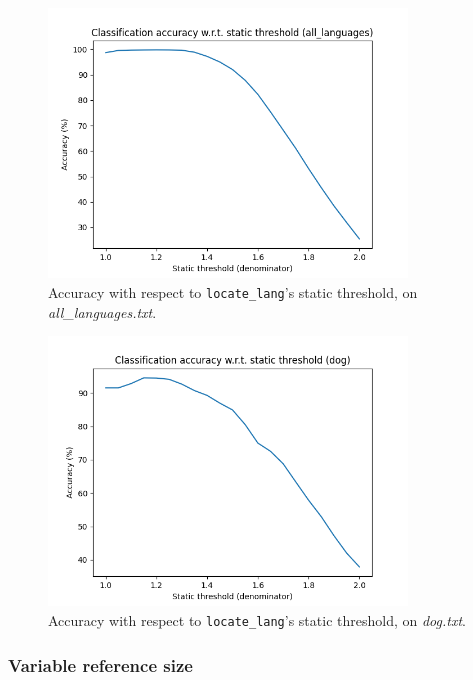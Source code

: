 \documentclass{article}
\begin{document}
\begin{figure}
    \centering
    \includegraphics[width=0.85\textwidth]{../results/all_languages/ll-s.png}
    \caption{Accuracy with respect to \texttt{locate\_lang}'s static threshold, on \textit{all\_languages.txt}.}
    \label{fig:ll_s_all_languages}
\end{figure}

\begin{figure}
    \centering
    \includegraphics[width=0.85\textwidth]{../results/dog/ll-s.png}
    \caption{Accuracy with respect to \texttt{locate\_lang}'s static threshold, on \textit{dog.txt}.}
    \label{fig:ll_s_dog}
\end{figure}

\subsubsection{Variable reference size}
\label{subsubsec:results_locate_lang_variable_reference_size}
\end{document}

